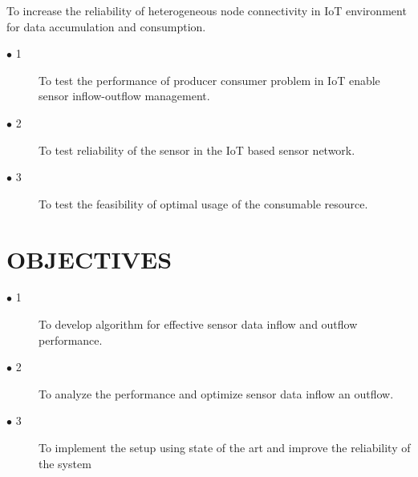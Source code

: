 \documentclass[a4paper, 12pt, notitlepage]{article}
\begin{document}
To increase the reliability of heterogeneous node connectivity in IoT  environment for data accumulation and consumption.
\begin{description}
\item[$\bullet$ 1]  To test the performance of producer consumer problem in IoT enable sensor inflow-outflow management.
\item[$\bullet$ 2] To test reliability of the sensor in the IoT based sensor network.
\item[$\bullet$ 3] To test the feasibility of optimal usage of the consumable resource.

\end{description}

\section{OBJECTIVES}

\begin{description}
\item[$\bullet$ 1] To develop algorithm for effective sensor data inflow and outflow performance.
\item[$\bullet$ 2] To analyze the performance and optimize sensor data inflow an outflow.
\item[$\bullet$ 3] To implement the setup using state of the art and improve the reliability of the system


\end{description}



%
%
%
\end{document}

